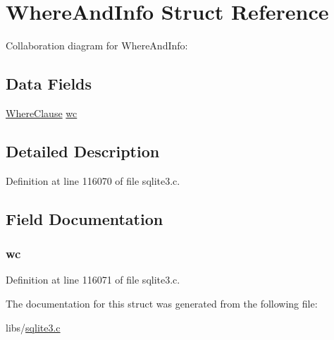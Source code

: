 \hypertarget{struct_where_and_info}{}\section{Where\+And\+Info Struct Reference}
\label{struct_where_and_info}


Collaboration diagram for Where\+And\+Info\+:
\subsection*{Data Fields}
\begin{DoxyCompactItemize}
\item 
\hyperlink{struct_where_clause}{Where\+Clause} \hyperlink{struct_where_and_info_a653226586e955747113703770419cf58}{wc}
\end{DoxyCompactItemize}


\subsection{Detailed Description}


Definition at line 116070 of file sqlite3.\+c.



\subsection{Field Documentation}
\hypertarget{struct_where_and_info_a653226586e955747113703770419cf58}{}
\subsubsection[{wc}]{ wc}\label{struct_where_and_info_a653226586e955747113703770419cf58}


Definition at line 116071 of file sqlite3.\+c.



The documentation for this struct was generated from the following file\+:\begin{DoxyCompactItemize}
\item 
libs/\hyperlink{sqlite3_8c}{sqlite3.\+c}\end{DoxyCompactItemize}

